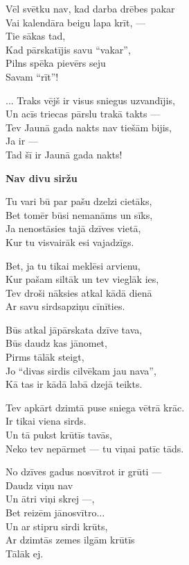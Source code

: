 \documentclass[14pt]{extarticle}
\begin{document}
{{Vēl svētku nav, kad darba drēbes pakar\\
Vai kalendāra beigu lapa krīt, ---\\
Tie sākas tad,\\
Kad pārskatījis savu ``vakar'',\\
Pilns spēka pievērs seju\\
Savam ``rīt''!

... Traks vējš ir visus sniegus uzvandījis,\\
Un acīs triecas pārslu trakā takts ---\\
Tev Jaunā gada nakts nav tiešām bijis,\\
Ja ir ---\\
Tad šī ir Jaunā gada nakts!

\newpage

{\bf Nav divu siržu}

Tu vari bū par pašu dzelzi cietāks,\\
Bet tomēr būsi nemanāms un sīks,\\
Ja nenostāsies tajā dzīves vietā,\\
Kur tu visvairāk esi vajadzīgs. 

Bet, ja tu tikai meklēsi arvienu,\\
Kur pašam siltāk un tev vieglāk ies,\\
Tev droši nāksies atkal kādā dienā\\
Ar savu sirdsapziņu cīnīties. 

Būs atkal jāpārskata dzīve tava,\\
Būs daudz kas jānomet,\\
Pirms tālāk steigt,\\
Jo ``divas sirdis cilvēkam jau nava'',\\
Kā tas ir kādā labā dzejā teikts. 

Tev apkārt dzimtā puse sniega vētrā krāc.\\
Ir tikai viena sirds.\\
Un tā pukst krūtīs tavās,\\
Neko tev nepārmet --- tu viņai patīc tāds.

No dzīves gadus nosvītrot ir grūti ---\\
Daudz viņu nav\\
Un ātri viņi skrej ---,\\
Bet reizēm jānosvītro...\\
Un ar stipru sirdi krūts,\\
Ar dzimtās zemes ilgām krūtīs\\
Tālāk ej. 

}}
\end{document}
